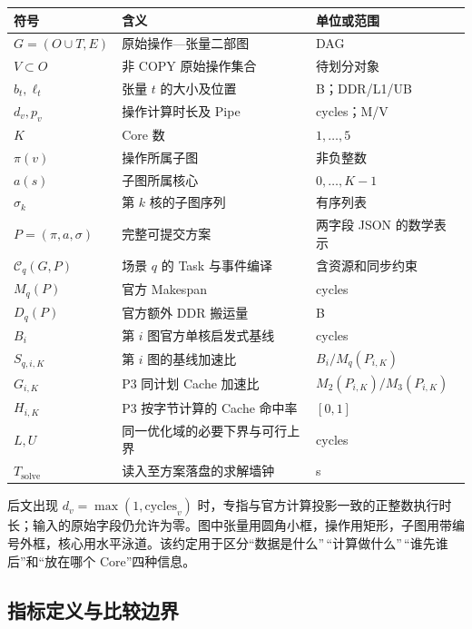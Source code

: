 \documentclass[anonymous,notoc]{gmcm2026}
\begin{document}
{\def\LTcaptype{table} %
\begin{longtable}[]{@{}lll@{}}
\toprule\noalign{}
符号 & 含义 & 单位或范围 \\
\midrule\noalign{}
\endhead
\bottomrule\noalign{}
\endlastfoot
\(G=(O\cup T,E)\) & 原始操作---张量二部图 & DAG \\
\(V\subset O\) & 非 COPY 原始操作集合 & 待划分对象 \\
\(b_t,\ell_t\) & 张量 \(t\) 的大小及位置 & B；DDR/L1/UB \\
\(d_v,p_v\) & 操作计算时长及 Pipe & cycles；M/V \\
\(K\) & Core 数 & \(1,\ldots,5\) \\
\(\pi(v)\) & 操作所属子图 & 非负整数 \\
\(a(s)\) & 子图所属核心 & \(0,\ldots,K-1\) \\
\(\sigma_k\) & 第 \(k\) 核的子图序列 & 有序列表 \\
\(P=(\pi,a,\sigma)\) & 完整可提交方案 & 两字段 JSON 的数学表示 \\
\(\mathcal C_q(G,P)\) & 场景 \(q\) 的 Task 与事件编译 & 含资源和同步约束 \\
\(M_q(P)\) & 官方 Makespan & cycles \\
\(D_q(P)\) & 官方额外 DDR 搬运量 & B \\
\(B_i\) & 第 \(i\) 图官方单核启发式基线 & cycles \\
\(S_{q,i,K}\) & 第 \(i\) 图的基线加速比 & \(B_i/M_q(P_{i,K})\) \\
\(G_{i,K}\) & P3 同计划 Cache 加速比 & \(M_2(P_{i,K})/M_3(P_{i,K})\) \\
\(H_{i,K}\) & P3 按字节计算的 Cache 命中率 & \([0,1]\) \\
\(L,U\) & 同一优化域的必要下界与可行上界 & cycles \\
\(T_{\mathrm{solve}}\) & 读入至方案落盘的求解墙钟 & s \\
\end{longtable}
}

后文出现 \(d_v=\max(1,\mathrm{cycles}_v)\) 时，专指与官方计算投影一致的正整数执行时长；输入的原始字段仍允许为零。图中张量用圆角小框，操作用矩形，子图用带编号外框，核心用水平泳道。该约定用于区分``数据是什么''\,``计算做什么''\,``谁先谁后''和``放在哪个 Core''四种信息。

\subsection{指标定义与比较边界}\label{ux6307ux6807ux5b9aux4e49ux4e0eux6bd4ux8f83ux8fb9ux754c}
\end{document}
